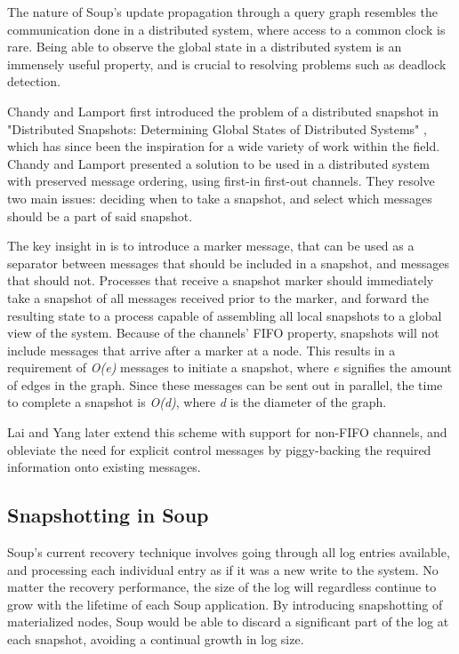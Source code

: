 \documentclass[b5paper]{report}
\begin{document}
The nature of Soup's update propagation through a query graph resembles the
communication done in a distributed system, where access to a common clock is
rare. Being able to observe the global state in a distributed system is an
immensely useful property, and is crucial to resolving problems such as deadlock
detection.

Chandy and Lamport first introduced the problem of a distributed snapshot in
"Distributed Snapshots: Determining Global States of Distributed Systems"
\cite{chandy-lamport}, which has since been the inspiration for a wide variety
of work within the field. Chandy and Lamport presented a solution to be used in
a distributed system with preserved message ordering, using first-in first-out
channels. They resolve two main issues: deciding when to take a snapshot, and
select which messages should be a part of said snapshot.

The key insight in \cite{chandy-lamport} is to introduce a marker message, that
can be used as a separator between messages that should be included in a
snapshot, and messages that should not. Processes that receive a snapshot marker
should immediately take a snapshot of all messages received prior to the marker,
and forward the resulting state to a process capable of assembling all local
snapshots to a global view of the system. Because of the channels' FIFO
property, snapshots will not include messages that arrive after a marker at a
node. This results in a requirement of \textit{O(e)} messages to initiate a
snapshot, where \textit{e} signifies the amount of edges in the graph. Since
these messages can be sent out in parallel, the time to complete a snapshot is
\textit{O(d)}, where \textit{d} is the diameter of the graph.

Lai and Yang \cite{lai-yang} later extend this scheme with support for non-FIFO
channels, and obleviate the need for explicit control messages by piggy-backing
the required information onto existing messages.

\subsection{Snapshotting in Soup}
Soup's current recovery technique involves going through all log entries
available, and processing each individual entry as if it was a new write to the
system. No matter the recovery performance, the size of the log will regardless
continue to grow with the lifetime of each Soup application. By introducing
snapshotting of materialized nodes, Soup would be able to discard a significant
part of the log at each snapshot, avoiding a continual growth in log size.
\end{document}
